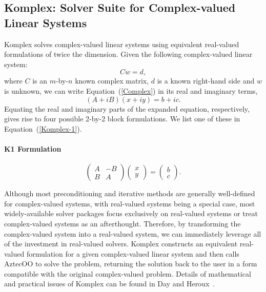 \documentclass[acmtoms,acmnow]{acmtrans2m}
\begin{document}
\subsection{Komplex: Solver Suite for Complex-valued Linear Systems}

Komplex solves complex-valued linear systems using equivalent 
real-valued formulations of twice the dimension.  Given the following 
complex-valued linear system:
\begin{equation}
\label{Complex}
C w = d,
\end{equation}
where $C$ is an $m$-by-$n$ known
complex matrix, $d$ is a known right-hand side and $w$ is unknown, 
we can write Equation~(\ref{Complex})
in its real and imaginary terms,
\begin{equation}\label{linearsystem}
( A + i B )(x+iy) = b+ic.
\end{equation}
Equating the real and imaginary parts of the expanded equation, 
respectively, gives rise to four
possible 2-by-2 block formulations.  We list one of these in 
Equation~(\ref{Komplex-1}).
\paragraph*{K1 Formulation}
\begin{equation}\label{Komplex-1}
   \left( \begin{array}{cc}
                       A & -B  \\
                       B &  A
   \end{array}
   \right)
   \left( \begin{array}{c}
                                    x  \\
                                    y
                             \end{array}
   \right)
   =
   \left( \begin{array}{c}
                                    b  \\
                                    c
                             \end{array}
   \right).
\end{equation}

Although most preconditioning and iterative methods are generally 
well-defined for complex-valued systems, with real-valued systems 
being a special case, most widely-available solver packages focus 
exclusively on real-valued systems or treat complex-valued systems 
as an afterthought.  Therefore, by transforming the complex-valued 
system into a real-valued system, we can immediately leverage all 
of the investment in real-valued solvers.  Komplex constructs an 
equivalent real-valued formulation for a given complex-valued linear 
system and then calls AztecOO to solve the problem, returning the 
solution back to the user in a form compatible with the original 
complex-valued problem.  Details of mathematical and practical 
issues of Komplex can be found in Day and Heroux~\cite{DayHero2001}.
\end{document}
